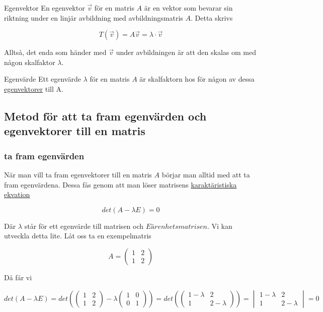 \documentclass[../main.tex]{subfiles}
\begin{document}
\begin{definition}{Egenvektor}
En egenvektor $\Vec{v}$ för en matris $A$ är en vektor som bevarar sin riktning under en linjär avbildning med avbildningsmatris $A$. Detta skrivs

$$
T(\Vec{v}) = A\Vec{v} = \lambda \cdot \Vec{v}
$$

Alltså, det enda som händer med $\Vec{v}$ under avbildningen är att den skalas om med någon skalfaktor $\lambda$.
\end{definition}

\begin{definition}{Egenvärde}
Ett egenvärde $\lambda$ för en matris $A$ är skalfaktorn hos för någon av dessa \underline{egenvektorer} till A.
\end{definition}

\subsection{Metod för att ta fram egenvärden och egenvektorer till en matris}
\subsubsection{ta fram egenvärden}
När man vill ta fram egenvektorer till en matris $A$ börjar man alltid med att ta fram egenvärdena. Dessa fås genom att man löser matrisens \underline{karaktäristiska ekvation}

$$
det(A - \lambda E) = 0
$$

Där $\lambda$ står för ett egenvärde till matrisen och $E är enhetsmatrisen$. Vi kan utveckla detta lite. Låt oss ta en exempelmatris

$$
A = \begin{pmatrix}
1 & 2\\
1& 2
\end{pmatrix}
$$

Då får vi

$$
det(A - \lambda E) = 
det(\begin{pmatrix}
1 & 2\\
1 & 2
\end{pmatrix} -
\lambda\begin{pmatrix}
1&0\\0&1
\end{pmatrix}) = 
det(
\begin{pmatrix}
1 - \lambda & 2\\
1 & 2 - \lambda
\end{pmatrix}
)
=
\begin{vmatrix}
1-\lambda & 2\\
1 & 2 - \lambda
\end{vmatrix} = 0
$$
\end{document}
